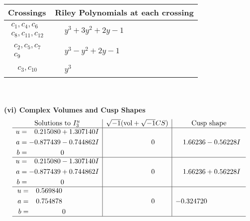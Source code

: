 \documentclass[1p]{elsarticle_modified}
\theoremstyle{definition}
\newcommand{\I}{\sqrt{-1}}
\begin{document}
\begin{tabular}{m{50pt}|m{274pt}}
Crossings & \hspace{64pt}Riley Polynomials at each crossing \\
\hline $$\begin{aligned}c_{1},c_{4},c_{6}\\c_{8},c_{11},c_{12}\end{aligned}$$&$\begin{aligned}
&y^3+3 y^2+2 y-1
\end{aligned}$\\
\hline $$\begin{aligned}c_{2},c_{5},c_{7}\\c_{9}\end{aligned}$$&$\begin{aligned}
&y^3- y^2+2 y-1
\end{aligned}$\\
\hline $$\begin{aligned}c_{3},c_{10}\end{aligned}$$&$\begin{aligned}
&y^3
\end{aligned}$\\
\hline
\end{tabular}\\~\\
\newpage\flushleft \textbf{(vi) Complex Volumes and Cusp Shapes}
$$\begin{array}{c|c|c}  
\text{Solutions to }I^u_{3}& \I (\text{vol} + \sqrt{-1}CS) & \text{Cusp shape}\\
 \hline 
\begin{aligned}
u &= \phantom{-}0.215080 + 1.307140 I \\
a &= -0.877439 - 0.744862 I \\
b &= \phantom{-0.000000 } 0\end{aligned}
 & \phantom{-0.000000 } 0 & \phantom{-}1.66236 - 0.56228 I \\ \hline\begin{aligned}
u &= \phantom{-}0.215080 - 1.307140 I \\
a &= -0.877439 + 0.744862 I \\
b &= \phantom{-0.000000 } 0\end{aligned}
 & \phantom{-0.000000 } 0 & \phantom{-}1.66236 + 0.56228 I \\ \hline\begin{aligned}
u &= \phantom{-}0.569840\phantom{ +0.000000I} \\
a &= \phantom{-}0.754878\phantom{ +0.000000I} \\
b &= \phantom{-0.000000 } 0\end{aligned}
 & \phantom{-0.000000 } 0 & -0.324720\phantom{ +0.000000I}\\
 \hline 
 \end{array}$$\newpage
\end{document}
